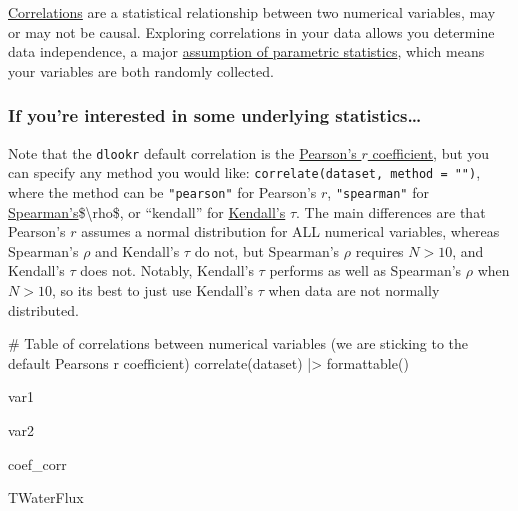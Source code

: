 \documentclass[
  letterpaper,
  DIV=11,
  numbers=noendperiod]{scrreprt}
\newenvironment{Shaded}{\begin{snugshade}}{\end{snugshade}}
\newcommand{\CommentTok}[1]{\textcolor[rgb]{0.37,0.37,0.37}{#1}}
\newcommand{\FunctionTok}[1]{\textcolor[rgb]{0.28,0.35,0.67}{#1}}
\newcommand{\NormalTok}[1]{\textcolor[rgb]{0.00,0.23,0.31}{#1}}
\newcommand{\SpecialCharTok}[1]{\textcolor[rgb]{0.37,0.37,0.37}{#1}}
\begin{document}
\href{https://en.wikipedia.org/wiki/Correlation}{Correlations} are a
statistical relationship between two numerical variables, may or may not
be causal. Exploring correlations in your data allows you determine data
independence, a major
\href{https://www.statology.org/parametric-tests-assumptions/}{assumption
of parametric statistics}, which means your variables are both randomly
collected.

\hypertarget{if-youre-interested-in-some-underlying-statistics}{%
\subsubsection{If you're interested in some underlying
statistics\ldots{}}\label{if-youre-interested-in-some-underlying-statistics}}

Note that the \texttt{dlookr} default correlation is the
\href{https://en.wikipedia.org/wiki/Pearson_correlation_coefficienthttps://en.wikipedia.org/wiki/Pearson_correlation_coefficient}{Pearson's
\(r\) coefficient}, but you can specify any method you would like:
\texttt{correlate(dataset,\ method\ =\ "")}, where the method can be
\texttt{"pearson"} for Pearson's \(r\), \texttt{"spearman"} for
\href{https://en.wikipedia.org/wiki/Spearman\%27s_rank_correlation_coefficient}{Spearman's}\$\textbackslash rho\$,
or ``kendall'' for
\href{https://en.wikipedia.org/wiki/Kendall_rank_correlation_coefficient}{Kendall's}
\(\tau\). The main differences are that Pearson's \(r\) assumes a normal
distribution for ALL numerical variables, whereas Spearman's \(\rho\)
and Kendall's \(\tau\) do not, but Spearman's \(\rho\) requires
\(N > 10\), and Kendall's \(\tau\) does not. Notably, Kendall's \(\tau\)
performs as well as Spearman's \(\rho\) when \(N > 10\), so its best to
just use Kendall's \(\tau\) when data are not normally distributed.

\begin{Shaded}
\begin{Highlighting}[]
\CommentTok{\# Table of correlations between numerical variables (we are sticking to the default Pearson\textquotesingle{}s r coefficient)}
\FunctionTok{correlate}\NormalTok{(dataset) }\SpecialCharTok{|\textgreater{}}
  \FunctionTok{formattable}\NormalTok{()}
\end{Highlighting}
\end{Shaded}

var1

var2

coef\_corr

TWaterFlux
\end{document}
